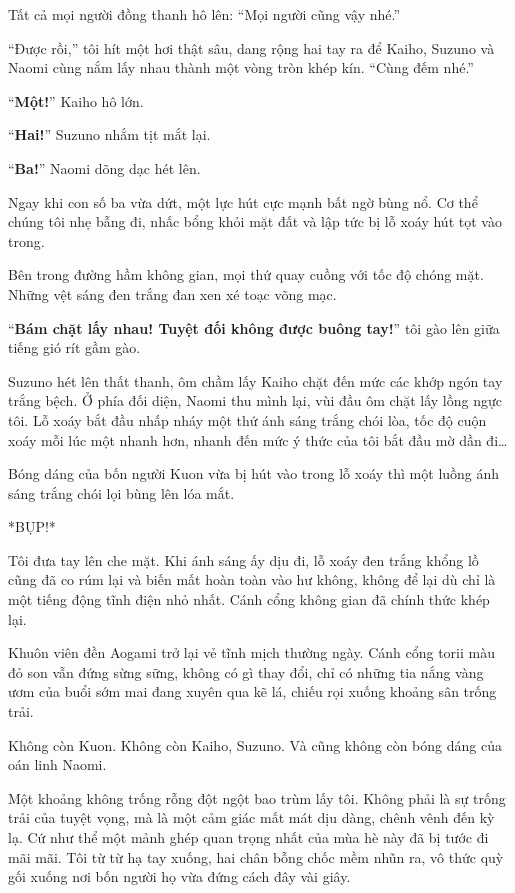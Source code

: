 \documentclass[../main.tex]{subfiles}
\begin{document}
Tất cả mọi người đồng thanh hô lên: ``Mọi người cũng vậy nhé.''

``Được rồi,'' tôi hít một hơi thật sâu, dang rộng hai tay ra để Kaiho, Suzuno và Naomi cùng nắm lấy nhau thành một vòng tròn khép kín. ``Cùng đếm nhé.''

``\textbf{Một!}'' Kaiho hô lớn.

``\textbf{Hai!}'' Suzuno nhắm tịt mắt lại.

``\textbf{Ba!}'' Naomi dõng dạc hét lên.

Ngay khi con số ba vừa dứt, một lực hút cực mạnh bất ngờ bùng nổ. Cơ thể chúng tôi nhẹ bẫng đi, nhấc bổng khỏi mặt đất và lập tức bị lỗ xoáy hút tọt vào trong.

Bên trong đường hầm không gian, mọi thứ quay cuồng với tốc độ chóng mặt. Những vệt sáng đen trắng đan xen xé toạc võng mạc.

``\textbf{Bám chặt lấy nhau! Tuyệt đối không được buông tay!}'' tôi gào lên giữa tiếng gió rít gầm gào.

Suzuno hét lên thất thanh, ôm chầm lấy Kaiho chặt đến mức các khớp ngón tay trắng bệch. Ở phía đối diện, Naomi thu mình lại, vùi đầu ôm chặt lấy lồng ngực tôi. Lỗ xoáy bắt đầu nhấp nháy một thứ ánh sáng trắng chói lòa, tốc độ cuộn xoáy mỗi lúc một nhanh hơn, nhanh đến mức ý thức của tôi bắt đầu mờ dần đi\dots


Bóng dáng của bốn người Kuon vừa bị hút vào trong lỗ xoáy thì một luồng ánh sáng trắng chói lọi bùng lên lóa mắt.

*BỤP!*

Tôi đưa tay lên che mặt. Khi ánh sáng ấy dịu đi, lỗ xoáy đen trắng khổng lồ cũng đã co rúm lại và biến mất hoàn toàn vào hư không, không để lại dù chỉ là một tiếng động tĩnh điện nhỏ nhất. Cánh cổng không gian đã chính thức khép lại.

Khuôn viên đền Aogami trở lại vẻ tĩnh mịch thường ngày. Cánh cổng torii màu đỏ son vẫn đứng sừng sững, không có gì thay đổi, chỉ có những tia nắng vàng ươm của buổi sớm mai đang xuyên qua kẽ lá, chiếu rọi xuống khoảng sân trống trải.

Không còn Kuon. Không còn Kaiho, Suzuno. Và cũng không còn bóng dáng của oán linh Naomi.

Một khoảng không trống rỗng đột ngột bao trùm lấy tôi. Không phải là sự trống trải của tuyệt vọng, mà là một cảm giác mất mát dịu dàng, chênh vênh đến kỳ lạ. Cứ như thể một mảnh ghép quan trọng nhất của mùa hè này đã bị tước đi mãi mãi. Tôi từ từ hạ tay xuống, hai chân bỗng chốc mềm nhũn ra, vô thức quỳ gối xuống nơi bốn người họ vừa đứng cách đây vài giây.
\end{document}
